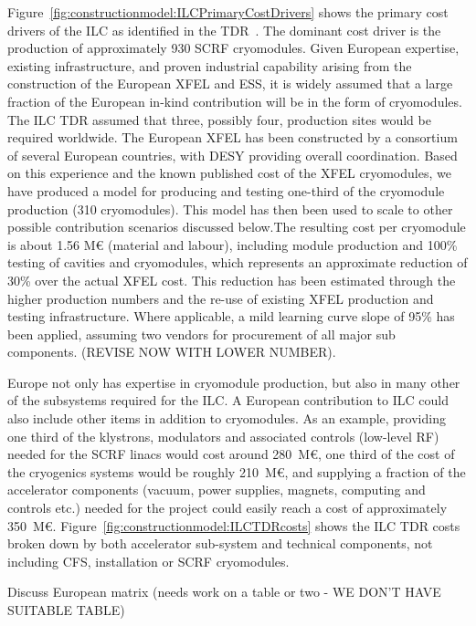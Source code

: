 \documentclass[%
 reprint,
 amsmath,amssymb,
 aps,
]{revtex4-1}
\begin{document}
Figure~\ref{fig:constructionmodel:ILCPrimaryCostDrivers} shows the primary cost drivers of the ILC as identified in the TDR~\cite{Adolphsen:2013kya}. The dominant cost driver is the production of approximately 930 SCRF cryomodules. Given European expertise, 
existing infrastructure, and proven industrial capability arising from the construction 
of the European XFEL and ESS, it is widely assumed that a large fraction of the European in-kind contribution  
will be in the form of cryomodules. The ILC TDR assumed that three, possibly four, production sites 
would be required worldwide.  
The European XFEL has been constructed by a consortium of several European countries, with DESY providing overall coordination.  Based on this experience and the known published cost  of the XFEL cryomodules, we have produced a model for producing and testing one-third of the cryomodule production (310 cryomodules). This model has then been used to scale to other possible contribution scenarios discussed below.The resulting cost per cryomodule is about 1.56 M\euro{} (material and labour), including module production and 100\% testing of cavities and cryomodules, which represents an approximate reduction of 30\% over the actual XFEL cost.  This reduction has been estimated through the higher production numbers and the re-use of existing XFEL production and testing infrastructure.  Where applicable, a mild learning curve slope of 95\% has been applied, assuming two vendors for procurement of all major sub components. (REVISE NOW WITH LOWER NUMBER).

Europe not only has expertise in cryomodule production, but also in many other 
of the subsystems required for the ILC. A European contribution to ILC could 
also include other items in addition to cryomodules. As an example, providing 
one third of the klystrons, modulators and associated controls (low-level RF) 
needed for the SCRF linacs would cost around 280~M\euro{}, one third of the cost of 
the cryogenics systems would be roughly 210~M\euro{}, and supplying a fraction of the 
accelerator components (vacuum, power supplies, magnets, computing and controls 
etc.) needed for the project could easily reach a cost of approximately 350~M\euro{}. 
Figure~\ref{fig:constructionmodel:ILCTDRcosts} shows the ILC TDR costs broken down by both accelerator sub-system and 
technical components, not including CFS, installation or SCRF cryomodules.

Discuss European matrix (needs work on a table or two - WE DON'T HAVE SUITABLE TABLE) 
\end{document}
